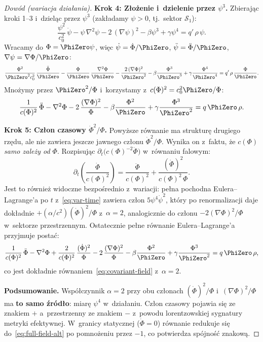 \begin{proof}[Dow\'od (wariacja dzia\l{}ania)]
\medskip\noindent\textbf{Krok 4: Z\l{}o\.zenie i~dzielenie przez $\psi^3$.}
Zbieraj\k{a}c kroki 1--3 i~dziel\k{a}c przez $\psi^3$
(zak\l{}adamy $\psi > 0$, tj.\ sektor $\mathcal{S}_1$):
\[
  \frac{\psi^2}{c_0^2}\,\ddot\psi
  - \psi\,\nabla^2\psi
  - 2\,(\nabla\psi)^2
  - \beta\psi^3 + \gamma\psi^4
  = q'\,\rho\,\psi.
\]
Wracamy do $\Phi = \PhiZero\psi$, wi\k{e}c
$\dot\psi = \dot\Phi/\PhiZero$,
$\ddot\psi = \ddot\Phi/\PhiZero$,
$\nabla\psi = \nabla\Phi/\PhiZero$:
\[
  \frac{\Phi^2}{\PhiZero^2 c_0^2}\,\frac{\ddot\Phi}{\PhiZero}
  - \frac{\Phi}{\PhiZero}\,\frac{\nabla^2\Phi}{\PhiZero}
  - \frac{2\,(\nabla\Phi)^2}{\PhiZero^2}
  - \beta\frac{\Phi^3}{\PhiZero^3}
  + \gamma\frac{\Phi^4}{\PhiZero^4}
  = q'\,\rho\,\frac{\Phi}{\PhiZero}.
\]
Mno\.zymy przez $\PhiZero^2/\Phi$ i~korzystamy z~$c(\Phi)^2 = c_0^2\PhiZero/\Phi$:
\[
  \frac{1}{c(\Phi)^2}\,\ddot\Phi
  - \nabla^2\Phi
  - 2\,\frac{(\nabla\Phi)^2}{\Phi}
  - \beta\frac{\Phi^2}{\PhiZero}
  + \gamma\frac{\Phi^3}{\PhiZero^2}
  = q\,\PhiZero\,\rho.
\]

\medskip\noindent\textbf{Krok 5: Cz\l{}on czasowy $\dot\Phi^2/\Phi$.}
Powy\.zsze r\'ownanie ma struktur\k{e} drugiego rz\k{e}du, ale
nie zawiera jeszcze jawnego cz\l{}onu $\dot\Phi^2/\Phi$.
Wynika on z~faktu, \.ze $c(\Phi)$ \emph{samo zale\.zy od $\Phi$}.
Rozpisuj\k{a}c $\partial_t\bigl(c(\Phi)^{-2}\dot\Phi\bigr)$
w~r\'ownaniu falowym:
\[
  \partial_t\!\left(\frac{\dot\Phi}{c(\Phi)^2}\right)
  = \frac{\ddot\Phi}{c(\Phi)^2}
  + \frac{(\dot\Phi)^2}{c(\Phi)^2\,\Phi}.
\]
Jest to r\'ownie\.z widoczne bezpo\'srednio z~wariacji: pe\l{}na
pochodna Eulera--Lagrange'a po $t$ z~\eqref{eq:var-time} zawiera
cz\l{}on $5\psi^4\dot\psi^2$, kt\'ory po renormalizacji
daje dok\l{}adnie $+(\alpha/c^2)(\dot\Phi)^2/\Phi$
z~$\alpha = 2$, analogicznie do cz\l{}onu
$-2(\nabla\Phi)^2/\Phi$ w~sektorze przestrzennym.
Ostatecznie pe\l{}ne r\'ownanie Eulera--Lagrange'a przyjmuje
posta\'c:
\begin{equation}\label{eq:covariant-derived}
  \frac{1}{c(\Phi)^2}\,\ddot\Phi
  - \nabla^2\Phi
  + \frac{2}{c(\Phi)^2}\,\frac{(\dot\Phi)^2}{\Phi}
  - 2\,\frac{(\nabla\Phi)^2}{\Phi}
  - \beta\frac{\Phi^2}{\PhiZero}
  + \gamma\frac{\Phi^3}{\PhiZero^2}
  = q\,\PhiZero\,\rho,
\end{equation}
co jest dok\l{}adnie r\'ownaniem~\eqref{eq:covariant-field}
z~$\alpha = 2$.

\medskip\noindent\textbf{Podsumowanie.}
Wsp\'o\l{}czynnik $\alpha = 2$ przy obu cz\l{}onach
$(\dot\Phi)^2/\Phi$ i~$(\nabla\Phi)^2/\Phi$ ma \textbf{to samo
\'zr\'od\l{}o}: miar\k{e} $\psi^4$ w~dzia\l{}aniu. Cz\l{}on
czasowy pojawia si\k{e} ze znakiem $+$ a~przestrzenny ze znakiem
$-$ z~powodu lorentzowskiej sygnatury metryki efektywnej.
W~granicy statycznej ($\dot\Phi = 0$) r\'ownanie redukuje si\k{e}
do~\eqref{eq:full-field-alt} po pomno\.zeniu przez $-1$,
co potwierdza sp\'ojno\'s\'c znakow\k{a}.
\end{proof}

